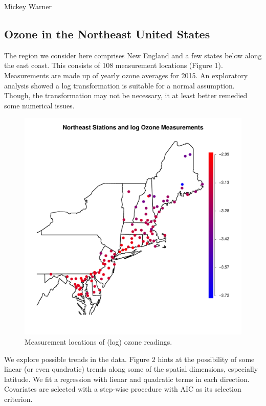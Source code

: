\documentclass[12pt]{article}
\begin{document}
Mickey Warner

\subsection*{Ozone in the Northeast United States}

The region we consider here comprises New England and a few states below along the east coast. This consists of 108 measurement locations (Figure 1). Measurements are made up of yearly ozone averages for 2015. An exploratory analysis showed a log transformation is suitable for a normal assumption. Though, the transformation may not be necessary, it at least better remedied some numerical issues.

\begin{figure}[ht]
\begin{center}
\includegraphics[scale=0.5]{figs/data.pdf}
\end{center}
\caption{Measurement locations of (log) ozone readings.}
\end{figure}

We explore possible trends in the data. Figure 2 hints at the possibility of some linear (or even quadratic) trends along some of the spatial dimensions, especially latitude. We fit a regression with lienar and quadratic terms in each direction. Covariates are selected with a step-wise procedure with AIC as its selection criterion.
\bigskip
\end{document}
